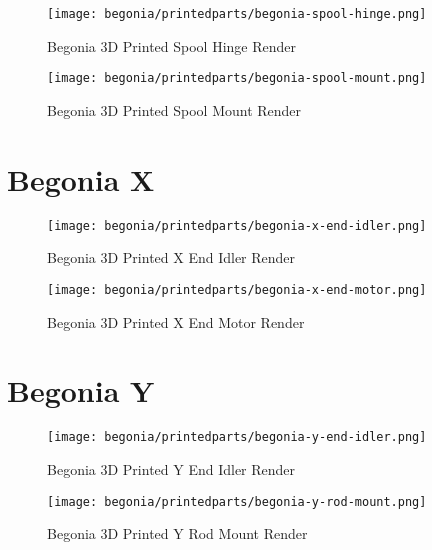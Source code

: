 \begin{figure}[H]
\centering
\texttt{[image: begonia/printedparts/begonia-spool-hinge.png]}
\caption{Begonia 3D Printed Spool Hinge Render}
\label{fig:begspoolhinge}
\end{figure}

\begin{figure}[H]
\centering
\texttt{[image: begonia/printedparts/begonia-spool-mount.png]}
\caption{Begonia 3D Printed Spool Mount Render}
\label{fig:begspoolmount}
\end{figure}


\section{Begonia X}

\begin{figure}[H]
\centering
\texttt{[image: begonia/printedparts/begonia-x-end-idler.png]}
\caption{Begonia 3D Printed X End Idler Render}
\label{fig:begxendidler}
\end{figure}

\begin{figure}[H]
\centering
\texttt{[image: begonia/printedparts/begonia-x-end-motor.png]}
\caption{Begonia 3D Printed X End Motor Render}
\label{fig:begxendmotor}
\end{figure}


\section{Begonia Y}

\begin{figure}[H]
\centering
\texttt{[image: begonia/printedparts/begonia-y-end-idler.png]}
\caption{Begonia 3D Printed Y End Idler Render}
\label{fig:begyendidler}
\end{figure}

\begin{figure}[H]
\centering
\texttt{[image: begonia/printedparts/begonia-y-rod-mount.png]}
\caption{Begonia 3D Printed Y Rod Mount Render}
\label{fig:begyrodmount}
\end{figure}


